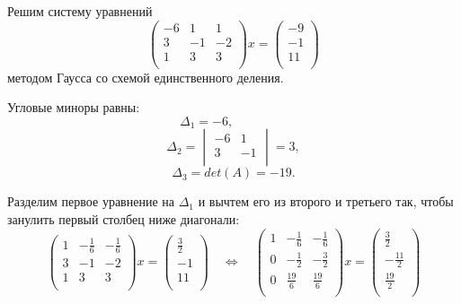 \documentclass{article}
\begin{document}
\begin{example}
	Решим систему уравнений
	\[
		\begin{pmatrix}
			-6	& 1	& 1	\\
			3	& -1	& -2	\\
			1	& 3	& 3	\\
		\end{pmatrix}
		x=
		\begin{pmatrix}
			-9 \\
			-1 \\
			11 \\
		\end{pmatrix}
	\]
	методом Гаусса со схемой единственного деления.

	Угловые миноры равны:
	\[\Delta_1=-6,\qquad\qquad\;\]
	\[\Delta_2=
		\begin{vmatrix}
			-6	& 1	\\
			3	& -1	\\
		\end{vmatrix}
		=3,
	\]
	\[\Delta_3=det(A)=-19.\]

	Разделим первое уравнение на $\Delta_1$ и вычтем его из второго и
	третьего так, чтобы занулить первый столбец ниже диагонали:
	\[
		\begin{pmatrix}
			1	&-\frac{1}{6}	& -\frac{1}{6}	\\
			3	& -1	& -2	\\
			1	& 3	& 3	\\
		\end{pmatrix}
		x=
		\begin{pmatrix}
			\frac{3}{2} \\
			-1 \\
			11 \\
		\end{pmatrix}
		\quad\Leftrightarrow\quad
		\begin{pmatrix}
			1	&-\frac{1}{6}	& -\frac{1}{6}	\\
			0	& -\frac{1}{2}	& -\frac{3}{2}	\\
			0	& \frac{19}{6}	& \frac{19}{6}	\\
		\end{pmatrix}
		x=
		\begin{pmatrix}
			\frac{3}{2} \\
			-\frac{11}{2} \\
			\frac{19}{2} \\
		\end{pmatrix}
	\]


\end{example}
\end{document}
